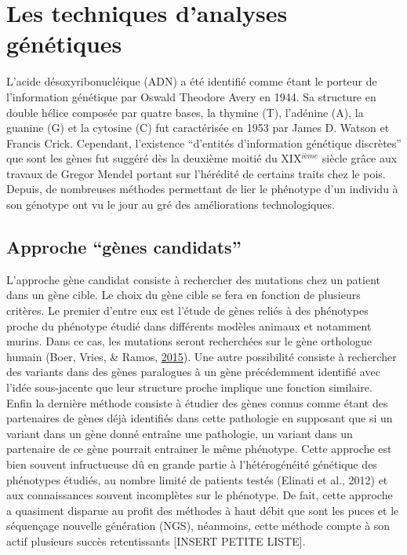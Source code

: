 \documentclass[12pt,twoside]{reedthesis}
\theoremstyle{definition}
\theoremstyle{definition}
\theoremstyle{remark}
\begin{document}
  \newpage  
  
  \section{Les techniques d'analyses
  génétiques}\label{les-techniques-danalyses-genetiques}
  
  L'acide désoxyribonucléique (ADN) a été identifié comme étant le porteur
  de l'information génétique par Oswald Theodore Avery en 1944. Sa
  structure en double hélice composée par quatre bases, la thymine (T),
  l'adénine (A), la guanine (G) et la cytosine (C) fut caractérisée en
  1953 par James D. Watson et Francis Crick. Cependant, l'existence
  ``d'entités d'information génétique discrètes'' que sont les gènes fut
  suggéré dès la deuxième moitié du XIX\(^{ième}\) siècle grâce aux
  travaux de Gregor Mendel portant sur l'hérédité de certains traits chez
  le pois. Depuis, de nombreuses méthodes permettant de lier le phénotype
  d'un individu à son génotype ont vu le jour au gré des améliorations
  technologiques.
  
  \subsection{\texorpdfstring{Approche ``gènes
  candidats''}{Approche gènes candidats}}\label{approche-genes-candidats}
  
  L'approche gène candidat consiste à rechercher des mutations chez un
  patient dans un gène cible. Le choix du gène cible se fera en fonction
  de plusieurs critères. Le premier d'entre eux est l'étude de gènes
  reliés à des phénotypes proche du phénotype étudié dans différents
  modèles animaux et notamment murins. Dans ce cas, les mutations seront
  recherchées sur le gène orthologue humain (Boer, Vries, \& Ramos,
  \protect\hyperlink{ref-DeBoer2015}{2015}). Une autre possibilité
  consiste à rechercher des variants dans des gènes paralogues à un gène
  précédemment identifié avec l'idée sous-jacente que leur structure
  proche implique une fonction similaire. Enfin la dernière méthode
  consiste à étudier des gènes connus comme étant des partenaires de gènes
  déjà identifiés dans cette pathologie en supposant que si un variant
  dans un gène donné entraîne une pathologie, un variant dans un
  partenaire de ce gène pourrait entrainer le même phénotype. Cette
  approche est bien souvent infructueuse dû en grande partie à
  l'hétérogénéité génétique des phénotypes étudiés, au nombre limité de
  patients testés (Elinati et al., 2012) et aux connaissances souvent
  incomplètes sur le phénotype. De fait, cette approche a quasiment
  disparue au profit des méthodes à haut débit que sont les puces et le
  séquençage nouvelle génération (NGS), néanmoins, cette méthode compte à
  son actif plusieurs succès retentissants {[}INSERT PETITE LISTE{]}.
  
\end{document}
